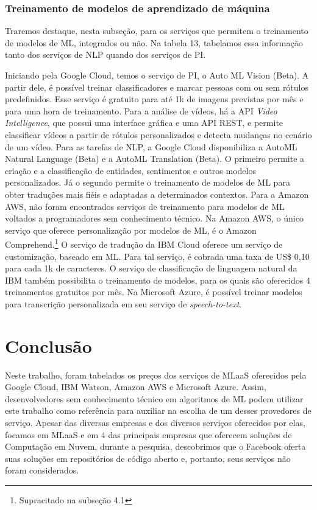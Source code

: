\documentclass{article}
\begin{document}
\subsubsection{Treinamento de modelos de aprendizado de máquina}
Traremos destaque, nesta subseção, para os serviços que permitem o treinamento de modelos de ML, integrados ou não. Na tabela 13, tabelamos essa informação tanto dos serviços de NLP quando dos serviços de PI.

Iniciando pela Google Cloud, temos o serviço de PI, o Auto ML Vision (Beta). A partir dele, é possível treinar classificadores e marcar pessoas com ou sem rótulos predefinidos. Esse serviço é gratuito para até 1k de imagens previstas por mês e para uma hora de treinamento. Para a análise de vídeos, há a API \textit{Video Intelligence}, que possui uma interface gráfica e uma API REST, e permite classificar vídeos a partir de rótulos personalizados e detecta mudanças no cenário de um vídeo. Para as tarefas de NLP, a Google Cloud disponibiliza a AutoML Natural Language (Beta) e a AutoML Translation (Beta). O primeiro permite a criação e a classificação de entidades, sentimentos e outros modelos personalizados. Já o segundo permite o treinamento de modelos de ML para obter traduções mais fiéis e adaptadas a determinados contextos. Para a Amazon AWS, não foram encontrados serviços de treinamento para modelos de ML voltados a programadores sem conhecimento técnico. Na Amazon AWS, o único serviço que oferece personalização por modelos de ML, é o Amazon Comprehend.\footnote{Supracitado na subseção 4.1}
O serviço de tradução da IBM Cloud oferece um serviço de customização, baseado em ML. Para tal serviço, é cobrada uma taxa de US\$ 0,10 para cada 1k de caracteres. O serviço de classificação de linguagem natural da IBM também possibilita o treinamento de modelos, para os quais são oferecidos 4 treinamentos gratuitos por mês. Na Microsoft Azure, é possível treinar modelos para transcrição personalizada em seu serviço de \textit{speech-to-text}.

\section{Conclusão}
Neste trabalho, foram tabelados os preços dos serviços de MLaaS oferecidos pela Google Cloud, IBM Watson, Amazon AWS e Microsoft Azure. Assim, desenvolvedores sem conhecimento técnico em algoritmos de ML podem utilizar este trabalho como referência para auxiliar na escolha de um desses provedores de serviço. Apesar das diversas empresas e dos diversos serviços oferecidos por elas, focamos em MLaaS e em 4 das principais empresas que oferecem soluções de Computação em Nuvem, durante a pesquisa, descobrimos que o Facebook oferta suas soluções em repositórios de código aberto e, portanto, seus serviços não foram considerados.
\end{document}
